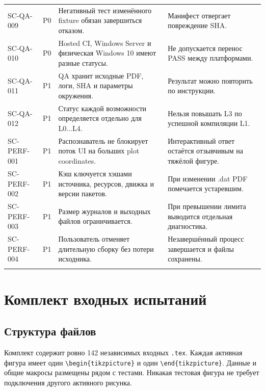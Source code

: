 \documentclass[11pt,a4paper,oneside]{scrreprt}
\begin{document}
\begin{longtable}{@{}>{\raggedright\arraybackslash}p{2.35cm}>{\raggedright\arraybackslash}p{0.75cm}>{\raggedright\arraybackslash}p{6.35cm}>{\raggedright\arraybackslash}p{5.2cm}@{}}
\footnotesize SC-QA-009 & P0 & Негативный тест изменённого fixture обязан завершиться отказом. & Манифест отвергает повреждение SHA. \\ \addlinespace[2pt]
\footnotesize SC-QA-010 & P0 & Hosted CI, Windows Server и физическая Windows 10 имеют разные статусы. & Не допускается перенос PASS между платформами. \\ \addlinespace[2pt]
\footnotesize SC-QA-011 & P1 & QA хранит исходные PDF, логи, SHA и параметры окружения. & Результат можно повторить по инструкции. \\ \addlinespace[2pt]
\footnotesize SC-QA-012 & P1 & Статус каждой возможности определяется отдельно для L0...L4. & Нельзя повышать L3 по успешной компиляции L1. \\ \addlinespace[2pt]
\footnotesize SC-PERF-001 & P1 & Распознаватель не блокирует поток UI на больших plot coordinates. & Интерактивный ответ остаётся отзывчивым на тяжёлой фигуре. \\ \addlinespace[2pt]
\footnotesize SC-PERF-002 & P1 & Кэш ключуется хэшами источника, ресурсов, движка и версии пакетов. & При изменении .dat PDF помечается устаревшим. \\ \addlinespace[2pt]
\footnotesize SC-PERF-003 & P1 & Размер журналов и выходных файлов ограничивается. & При превышении лимита выводится отдельная диагностика. \\ \addlinespace[2pt]
\footnotesize SC-PERF-004 & P1 & Пользователь отменяет длительную сборку без потери исходника. & Незавершённый процесс завершается и файлы сохранены. \\ \addlinespace[2pt]
\end{longtable}
\normalsize


\chapter{Комплект входных испытаний}\label{ux43aux43eux43cux43fux43bux435ux43aux442-ux432ux445ux43eux434ux43dux44bux445-ux438ux441ux43fux44bux442ux430ux43dux438ux439}

\section{Структура файлов}\label{ux441ux442ux440ux443ux43aux442ux443ux440ux430-ux444ux430ux439ux43bux43eux432}

Комплект содержит ровно 142 независимых входных \texttt{.tex}. Каждая активная фигура имеет один \texttt{\textbackslash{}begin\{tikzpicture\}} и один \texttt{\textbackslash{}end\{tikzpicture\}}. Данные и общие макросы размещены рядом с тестами. Никакая тестовая фигура не требует подключения другого активного рисунка.
\end{document}
